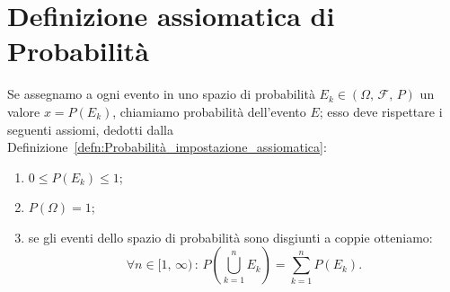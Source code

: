     \section{Definizione assiomatica di Probabilità}
        \begin{defn}
            Se assegnamo a ogni evento in uno spazio di probabilità $E_k \in (\Omega,\,\mathscr{F},\,P)$ un valore $x = P(E_k)$, chiamiamo probabilità dell'evento $E$; esso deve rispettare i seguenti assiomi, dedotti dalla Definizione~\ref{defn:Probabilità_impostazione_assiomatica}:
            \begin{enumerate}[\indent I)]
                \item $0 \leq P(E_k) \leq 1$;
                \item $P(\Omega) = 1$;
                \item  se gli eventi dello spazio di probabilità sono disgiunti a coppie otteniamo: \[
                \forall n \in [1,\,\infty)\,:\,P(\bigcup_{k=1}^{n} E_k) = \sum_{k=1}^{n} P(E_k)
                .\] 
            \end{enumerate}
        \end{defn}
